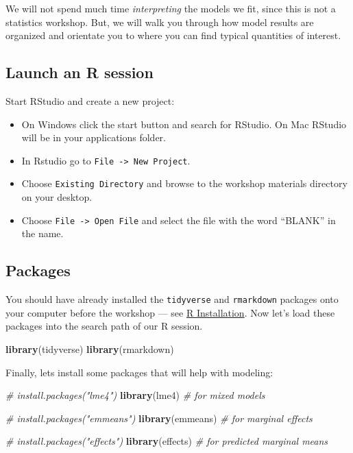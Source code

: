 \documentclass[
]{book}
\newenvironment{Shaded}{\begin{snugshade}}{\end{snugshade}}
\newcommand{\CommentTok}[1]{\textcolor[rgb]{0.56,0.35,0.01}{\textit{#1}}}
\newcommand{\KeywordTok}[1]{\textcolor[rgb]{0.13,0.29,0.53}{\textbf{#1}}}
\newcommand{\NormalTok}[1]{#1}
\providecommand{\tightlist}{%
  \setlength{\itemsep}{0pt}\setlength{\parskip}{0pt}}
\begin{document}
We will not spend much time \emph{interpreting} the models we fit, since this is not a statistics workshop. But, we will walk you through how model results are organized and orientate you to where you can find typical quantities of interest.

\hypertarget{launch-an-r-session}{%
\subsection{Launch an R session}\label{launch-an-r-session}}

Start RStudio and create a new project:

\begin{itemize}
\tightlist
\item
  On Windows click the start button and search for RStudio. On Mac RStudio will be in your applications folder.
\item
  In Rstudio go to \texttt{File\ -\textgreater{}\ New\ Project}.
\item
  Choose \texttt{Existing\ Directory} and browse to the workshop materials directory on your desktop.
\item
  Choose \texttt{File\ -\textgreater{}\ Open\ File} and select the file with the word ``BLANK'' in the name.
\end{itemize}

\hypertarget{packages}{%
\subsection{Packages}\label{packages}}

You should have already installed the \texttt{tidyverse} and \texttt{rmarkdown} packages onto your computer before the workshop --- see \href{./Rinstall.html}{R Installation}. Now let's load these packages into the search path of our R session.

\begin{Shaded}
\begin{Highlighting}[]
\KeywordTok{library}\NormalTok{(tidyverse)}
\KeywordTok{library}\NormalTok{(rmarkdown)}
\end{Highlighting}
\end{Shaded}

Finally, lets install some packages that will help with modeling:

\begin{Shaded}
\begin{Highlighting}[]
\CommentTok{\# install.packages("lme4")}
\KeywordTok{library}\NormalTok{(lme4)  }\CommentTok{\# for mixed models}

\CommentTok{\# install.packages("emmeans")}
\KeywordTok{library}\NormalTok{(emmeans)  }\CommentTok{\# for marginal effects}

\CommentTok{\# install.packages("effects")}
\KeywordTok{library}\NormalTok{(effects)  }\CommentTok{\# for predicted marginal means}
\end{Highlighting}
\end{Shaded}
\end{document}
